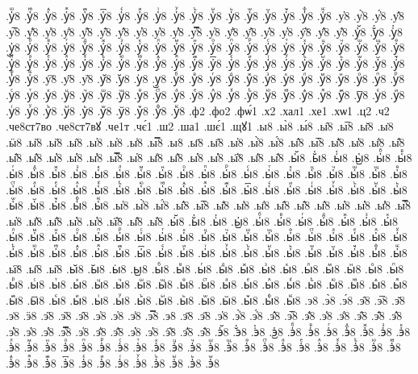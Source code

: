 {.у҅ⷻ8
.у҅ⷼ8
.у҅ⷽ8
.у҅ⷾ8
.у҅ⷿ8
.у҅꙯8
.у҅ꙴ8
.у҅ꙵ8
.у҅ꙶ8
.у҅ꙷ8
.у҅ꙸ8
.у҅ꙹ8
.у҅ꙺ8
.у҅ꙻ8
.у҅꙼8
.у҅꙽8
.у҅ꚞ8
.у҅ꚟ8
.у҆8
.у҆̀8
.у҆́8
.у҆̂8
.у҆̅8
.у҆̆8
.у҆̇8
.у҆̈8
.у҆̋8
.у҆̏8
.у҆̑8
.у҆̓8
.у҆̔8
.у҆̾8
.у҆̿8
.у҆͘8
.у҆҃8
.у҆҄8
.у҆҅8
.у҆҆8
.у҆҇8
.у҆᷀8
.у҆᷁8
.у҆᷶8
.у᷷҆8
.у᷸҆8
.у᷹҆8
.у҆ⷠ8
.у҆ⷡ8
.у҆ⷢ8
.у҆ⷣ8
.у҆ⷤ8
.у҆ⷥ8
.у҆ⷦ8
.у҆ⷧ8
.у҆ⷨ8
.у҆ⷩ8
.у҆ⷪ8
.у҆ⷫ8
.у҆ⷬ8
.у҆ⷭ8
.у҆ⷮ8
.у҆ⷯ8
.у҆ⷰ8
.у҆ⷱ8
.у҆ⷲ8
.у҆ⷳ8
.у҆ⷴ8
.у҆ⷵ8
.у҆ⷶ8
.у҆ⷷ8
.у҆ⷸ8
.у҆ⷹ8
.у҆ⷺ8
.у҆ⷻ8
.у҆ⷼ8
.у҆ⷽ8
.у҆ⷾ8
.у҆ⷿ8
.у҆꙯8
.у҆ꙴ8
.у҆ꙵ8
.у҆ꙶ8
.у҆ꙷ8
.у҆ꙸ8
.у҆ꙹ8
.у҆ꙺ8
.у҆ꙻ8
.у҆꙼8
.у҆꙽8
.у҆ꚞ8
.у҆ꚟ8
.у҇8
.у᷀8
.у᷁8
.у᷶8
.у᷷8
.у᷸8
.у᷹8
.уⷠ8
.уⷡ8
.уⷢ8
.уⷣ8
.уⷤ8
.уⷥ8
.уⷦ8
.уⷧ8
.уⷨ8
.уⷩ8
.уⷪ8
.уⷫ8
.уⷬ8
.уⷭ8
.уⷮ8
.уⷯ8
.уⷰ8
.уⷱ8
.уⷲ8
.уⷳ8
.уⷴ8
.уⷵ8
.уⷶ8
.уⷷ8
.уⷸ8
.уⷹ8
.уⷺ8
.уⷻ8
.уⷼ8
.уⷽ8
.уⷾ8
.уⷿ8
.у꙯8
.уꙴ8
.уꙵ8
.уꙶ8
.уꙷ8
.уꙸ8
.уꙹ8
.уꙺ8
.уꙻ8
.у꙼8
.у꙽8
.уꚞ8
.уꚟ8
.ф2
.фо2
.фѡ́1
.х2
.хал1
.хе1
.хѡ1
.ц2
.ч2
.че8ст7во
.че8ст7вꙋ
.че1т
.чє́1
.ш2
.ша1
.шє́1
.щꙋ1
.ы8
.ы̀8
.ы́8
.ы̂8
.ы̅8
.ы̆8
.ы̇8
.ӹ8
.ы̋8
.ы̏8
.ы̑8
.ы̓8
.ы̔8
.ы̾8
.ы̿8
.ы͘8
.ы҃8
.ы҄8
.ы҅8
.ы҅̀8
.ы҅́8
.ы҅̂8
.ы҅̅8
.ы҅̆8
.ы҅̇8
.ы҅̈8
.ы҅̋8
.ы҅̏8
.ы҅̑8
.ы҅̓8
.ы҅̔8
.ы҅̾8
.ы҅̿8
.ы҅͘8
.ы҅҃8
.ы҅҄8
.ы҅҅8
.ы҅҆8
.ы҅҇8
.ы҅᷀8
.ы҅᷁8
.ы҅᷶8
.ы᷷҅8
.ы᷸҅8
.ы᷹҅8
.ы҅ⷠ8
.ы҅ⷡ8
.ы҅ⷢ8
.ы҅ⷣ8
.ы҅ⷤ8
.ы҅ⷥ8
.ы҅ⷦ8
.ы҅ⷧ8
.ы҅ⷨ8
.ы҅ⷩ8
.ы҅ⷪ8
.ы҅ⷫ8
.ы҅ⷬ8
.ы҅ⷭ8
.ы҅ⷮ8
.ы҅ⷯ8
.ы҅ⷰ8
.ы҅ⷱ8
.ы҅ⷲ8
.ы҅ⷳ8
.ы҅ⷴ8
.ы҅ⷵ8
.ы҅ⷶ8
.ы҅ⷷ8
.ы҅ⷸ8
.ы҅ⷹ8
.ы҅ⷺ8
.ы҅ⷻ8
.ы҅ⷼ8
.ы҅ⷽ8
.ы҅ⷾ8
.ы҅ⷿ8
.ы҅꙯8
.ы҅ꙴ8
.ы҅ꙵ8
.ы҅ꙶ8
.ы҅ꙷ8
.ы҅ꙸ8
.ы҅ꙹ8
.ы҅ꙺ8
.ы҅ꙻ8
.ы҅꙼8
.ы҅꙽8
.ы҅ꚞ8
.ы҅ꚟ8
.ы҆8
.ы҆̀8
.ы҆́8
.ы҆̂8
.ы҆̅8
.ы҆̆8
.ы҆̇8
.ы҆̈8
.ы҆̋8
.ы҆̏8
.ы҆̑8
.ы҆̓8
.ы҆̔8
.ы҆̾8
.ы҆̿8
.ы҆͘8
.ы҆҃8
.ы҆҄8
.ы҆҅8
.ы҆҆8
.ы҆҇8
.ы҆᷀8
.ы҆᷁8
.ы҆᷶8
.ы᷷҆8
.ы᷸҆8
.ы᷹҆8
.ы҆ⷠ8
.ы҆ⷡ8
.ы҆ⷢ8
.ы҆ⷣ8
.ы҆ⷤ8
.ы҆ⷥ8
.ы҆ⷦ8
.ы҆ⷧ8
.ы҆ⷨ8
.ы҆ⷩ8
.ы҆ⷪ8
.ы҆ⷫ8
.ы҆ⷬ8
.ы҆ⷭ8
.ы҆ⷮ8
.ы҆ⷯ8
.ы҆ⷰ8
.ы҆ⷱ8
.ы҆ⷲ8
.ы҆ⷳ8
.ы҆ⷴ8
.ы҆ⷵ8
.ы҆ⷶ8
.ы҆ⷷ8
.ы҆ⷸ8
.ы҆ⷹ8
.ы҆ⷺ8
.ы҆ⷻ8
.ы҆ⷼ8
.ы҆ⷽ8
.ы҆ⷾ8
.ы҆ⷿ8
.ы҆꙯8
.ы҆ꙴ8
.ы҆ꙵ8
.ы҆ꙶ8
.ы҆ꙷ8
.ы҆ꙸ8
.ы҆ꙹ8
.ы҆ꙺ8
.ы҆ꙻ8
.ы҆꙼8
.ы҆꙽8
.ы҆ꚞ8
.ы҆ꚟ8
.ы҇8
.ы᷀8
.ы᷁8
.ы᷶8
.ы᷷8
.ы᷸8
.ы᷹8
.ыⷠ8
.ыⷡ8
.ыⷢ8
.ыⷣ8
.ыⷤ8
.ыⷥ8
.ыⷦ8
.ыⷧ8
.ыⷨ8
.ыⷩ8
.ыⷪ8
.ыⷫ8
.ыⷬ8
.ыⷭ8
.ыⷮ8
.ыⷯ8
.ыⷰ8
.ыⷱ8
.ыⷲ8
.ыⷳ8
.ыⷴ8
.ыⷵ8
.ыⷶ8
.ыⷷ8
.ыⷸ8
.ыⷹ8
.ыⷺ8
.ыⷻ8
.ыⷼ8
.ыⷽ8
.ыⷾ8
.ыⷿ8
.ы꙯8
.ыꙴ8
.ыꙵ8
.ыꙶ8
.ыꙷ8
.ыꙸ8
.ыꙹ8
.ыꙺ8
.ыꙻ8
.ы꙼8
.ы꙽8
.ыꚞ8
.ыꚟ8
.э8
.э̀8
.э́8
.э̂8
.э̅8
.э̆8
.э̇8
.ӭ8
.э̋8
.э̏8
.э̑8
.э̓8
.э̔8
.э̾8
.э̿8
.э͘8
.э҃8
.э҄8
.э҅8
.э҅̀8
.э҅́8
.э҅̂8
.э҅̅8
.э҅̆8
.э҅̇8
.э҅̈8
.э҅̋8
.э҅̏8
.э҅̑8
.э҅̓8
.э҅̔8
.э҅̾8
.э҅̿8
.э҅͘8
.э҅҃8
.э҅҄8
.э҅҅8
.э҅҆8
.э҅҇8
.э҅᷀8
.э҅᷁8
.э҅᷶8
.э᷷҅8
.э᷸҅8
.э᷹҅8
.э҅ⷠ8
.э҅ⷡ8
.э҅ⷢ8
.э҅ⷣ8
.э҅ⷤ8
.э҅ⷥ8
.э҅ⷦ8
.э҅ⷧ8
.э҅ⷨ8
.э҅ⷩ8
.э҅ⷪ8
.э҅ⷫ8
.э҅ⷬ8
.э҅ⷭ8
.э҅ⷮ8
.э҅ⷯ8
.э҅ⷰ8
.э҅ⷱ8
.э҅ⷲ8
.э҅ⷳ8
.э҅ⷴ8
.э҅ⷵ8
.э҅ⷶ8
.э҅ⷷ8
.э҅ⷸ8
.э҅ⷹ8
.э҅ⷺ8
.э҅ⷻ8
.э҅ⷼ8
.э҅ⷽ8
.э҅ⷾ8
.э҅ⷿ8
.э҅꙯8
.э҅ꙴ8
.э҅ꙵ8
.э҅ꙶ8
.э҅ꙷ8
.э҅ꙸ8
.э҅ꙹ8
.э҅ꙺ8
.э҅ꙻ8
}
